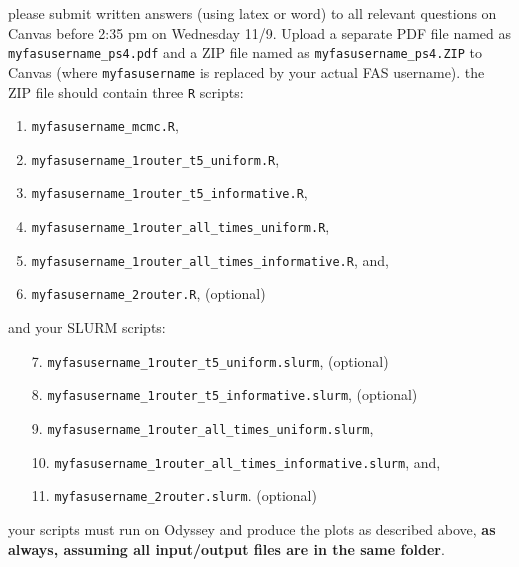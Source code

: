 \documentclass[11pt]{article}
\begin{document}
please submit written answers (using latex or word) to all relevant questions on Canvas before 2:35 pm on Wednesday 11/9. Upload a separate PDF file named as \texttt{myfasusername\_ps4.pdf} and a ZIP file named as \texttt{myfasusername\_ps4.ZIP} to Canvas (where \texttt{myfasusername} is replaced by your actual FAS username). the ZIP file should contain three \texttt{R} scripts:
\begin{enumerate}
\item \texttt{myfasusername\_mcmc.R}, 
\item \texttt{myfasusername\_1router\_t5\_uniform.R},
\item \texttt{myfasusername\_1router\_t5\_informative.R},
\item \texttt{myfasusername\_1router\_all\_times\_uniform.R},
\item \texttt{myfasusername\_1router\_all\_times\_informative.R}, and,
\item \texttt{myfasusername\_2router.R}, (optional)
\end{enumerate}
and your SLURM scripts:
\begin{enumerate}
\item[7.] \texttt{myfasusername\_1router\_t5\_uniform.slurm}, (optional)
\item[8.] \texttt{myfasusername\_1router\_t5\_informative.slurm}, (optional)
\item[9.] \texttt{myfasusername\_1router\_all\_times\_uniform.slurm},
\item[10.] \texttt{myfasusername\_1router\_all\_times\_informative.slurm}, and,
\item[11.] \texttt{myfasusername\_2router.slurm}. (optional)
\end{enumerate}
your scripts must run on Odyssey and produce the plots as described above, \textbf{as always, assuming all input/output files are in the same folder}. 
\end{document}
